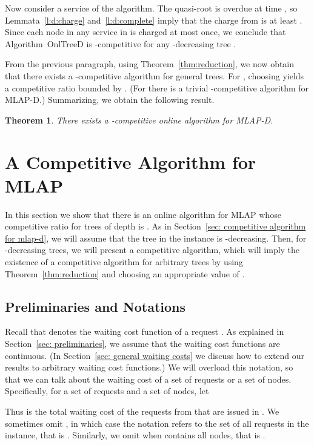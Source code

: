 \documentclass[a4paper]{article}
\newtheorem{theorem}{Theorem}[section]
\newcommand{\OnAlgTreesDeadlines}{{\sc OnlTreeD}}
\newcommand{\MLAP}{\mbox{\rm\textsf{MLAP}}}
\newcommand{\MLAPD}{\mbox{\rm\textsf{MLAP-D}}}
\begin{document}
Now consider a service  of the algorithm. The quasi-root  is
overdue at time , so Lemmata~\ref{l:d:charge} and~\ref{l:d:complete}
imply that the charge from  is at least
. Since
each node in any service in  is charged at most once, we
conclude that Algorithm~{\OnAlgTreesDeadlines} is -competitive for any
-decreasing tree .

From the previous paragraph, using Theorem~\ref{thm:reduction}, we now
obtain that there exists a -competitive
algorithm for general trees. For , choosing  yields a competitive
ratio bounded by
.
(For  there is a trivial -competitive algorithm for {\MLAPD}.)
Summarizing, we obtain the following result. 

\begin{theorem}
There exists a -competitive online algorithm for {\MLAPD}.
\end{theorem}



\section{A Competitive Algorithm for {\MLAP}}
\label{sec: competitive algorithm for mlap}


In this section we show that there is an online algorithm for {\MLAP} 
whose competitive ratio for trees of depth  is . 
As in Section~\ref{sec: competitive algorithm for mlap-d}, we will
assume that the tree  in the instance is -decreasing.
Then, for -decreasing trees, we will present a competitive algorithm,
which will imply the existence of a competitive algorithm for
arbitrary trees by using Theorem~\ref{thm:reduction}
and choosing an appropriate value of .


\subsection{Preliminaries and Notations}
\label{subsec: mlap notations}

Recall that  denotes the waiting cost function of a request
. As explained in Section~\ref{sec: preliminaries}, we assume that 
the waiting cost functions are continuous. 
(In Section~\ref{sec: general waiting costs} we discuss how to extend our
results to arbitrary waiting cost functions.)
We will overload this notation, so that we can talk about the waiting
cost of a set of requests or a set of
nodes. Specifically, for a set  of requests and a set  of
nodes, let

Thus  is the total waiting cost of the requests from
 that are issued in . 
We sometimes omit , in which case the notation refers to the set of
all requests in the instance, that is . 
Similarly, we omit  when  contains all nodes,
that is .
\end{document}
